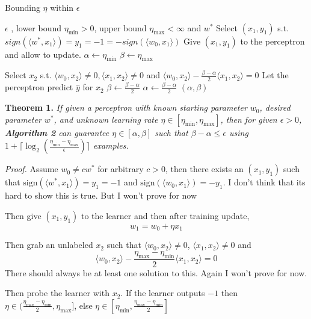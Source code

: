\documentclass{article}
\begin{document}
\begin{algorithm}
\caption{Bounding $\eta$ within $\epsilon$ }
\begin{algorithmic}[1]
	\REQUIRE $\epsilon$ , lower bound $\eta_{\min} > 0$, upper bound $\eta_{\max} < \infty$ and $w^*$
	\STATE Select $(x_1 , y_1)$ s.t. $sign(\langle w^* , x_1 \rangle) = y_1 = -1 = 
	-sign(\langle w_0 , x_1 \rangle )$
	\STATE Give $(x_1, y_1)$ to the perceptron and allow to update.
	\STATE $\alpha \leftarrow \eta_{\min}$
	\STATE $\beta \leftarrow \eta_{\max}$
	
	\WHILE{$\beta - \alpha > \epsilon$}
		\STATE Select $ x_2$ s.t. $\langle w_0 , x_2 \rangle \neq 0, \langle x_1 , x_2 \rangle \neq 0$ and $\langle w_0, x_2 \rangle - \frac{\beta - \alpha}{2}\langle x_1, x_2 \rangle = 0$
		\STATE Let the perceptron predict $\hat{y}$ for $x_2$
			\STATE $ \beta \leftarrow \frac{\beta - \alpha}{2}$ 		
		\ELSE
			\STATE $ \alpha \leftarrow \frac{\beta - \alpha}{2}$ 
		\ENDIF	
	\ENDWHILE   
	\RETURN $(\alpha , \beta)$
\end{algorithmic}
\end{algorithm} 

\textbf{Theorem 1.}
\textit{
If given a perceptron with known starting parameter $w_0$, desired parameter $w^*$, and unknown 
learning rate $\eta \in [\eta_{\min} , \eta_{\max}]$, then for given $\epsilon > 0$, \textbf{Algorithm 2} can guarantee $\eta \in 
[\alpha, \beta]$ such that $\beta - \alpha \leq \epsilon$ using $1 + \lceil \log_2(\frac{\eta_
{\min} - \eta_{\max}}{\epsilon})\rceil$ examples.}

\textit{Proof.}
Assume $w_0 \neq cw^*$ for arbitrary $c > 0$, then there exists an $(x_1, y_1)$ such that $\text{sign}(\langle w^*,x_1 \rangle) = y_1 = -1$ and $\text{sign}(\langle w_0,x_1 \rangle) = -y_1$.
\color{red}
I don't think that its hard to show this is true. But I won't prove for now
\color{black}

Then give $(x_1, y_1)$ to the learner and then after training update,
$$
w_1 = w_0 + \eta x_1
$$

Then grab an unlabeled $x_2$ such that
$\langle w_0,x_2 \rangle \neq 0$, $\langle x_1, x_2 \rangle \neq 0$
and 
$$
\langle w_0,x_2 \rangle - \frac{\eta_{\max} - \eta_{\min}}{2} \langle x_1, x_2 \rangle = 0
$$
\color{red}
There should always be at least one solution to this. Again I won't prove for now.
\color{black}


Then probe the learner with $x_2$. If the learner outputs $-1$ then
$\eta \in (\frac{\eta_{\max} - \eta_{\min}}{2} , \eta_{\max}]$, else 
$\eta \in [\eta_{\min},\frac{\eta_{\max} - \eta_{\min}}{2}]$
\end{document}
